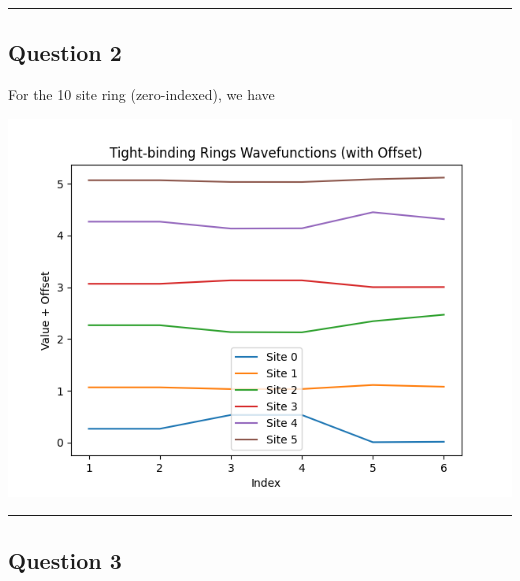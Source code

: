 \documentclass[11pt]{article}
\begin{document}
\vskip 1cm
\hrule
\vskip 1cm


\subsection*{Question 2}

For the 10 site ring (zero-indexed), we have 
\begin{center}
  \includegraphics*[scale=0.7]{plots/Q2plot.png}
\end{center}

\vskip 1cm
\hrule
\vskip 1cm


\subsection*{Question 3}
\end{document}

